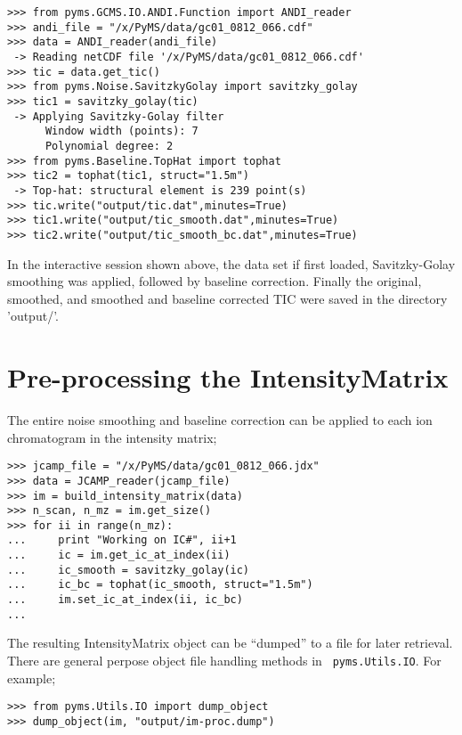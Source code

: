 \begin{verbatim}
>>> from pyms.GCMS.IO.ANDI.Function import ANDI_reader
>>> andi_file = "/x/PyMS/data/gc01_0812_066.cdf"
>>> data = ANDI_reader(andi_file)
 -> Reading netCDF file '/x/PyMS/data/gc01_0812_066.cdf'
>>> tic = data.get_tic()
>>> from pyms.Noise.SavitzkyGolay import savitzky_golay
>>> tic1 = savitzky_golay(tic)
 -> Applying Savitzky-Golay filter
      Window width (points): 7
      Polynomial degree: 2
>>> from pyms.Baseline.TopHat import tophat
>>> tic2 = tophat(tic1, struct="1.5m")
 -> Top-hat: structural element is 239 point(s)
>>> tic.write("output/tic.dat",minutes=True)
>>> tic1.write("output/tic_smooth.dat",minutes=True)
>>> tic2.write("output/tic_smooth_bc.dat",minutes=True)
\end{verbatim}

\noindent
In the interactive session shown above, the data set if first loaded,
Savitzky-Golay smoothing was applied, followed by baseline correction.
Finally the original, smoothed, and smoothed and baseline corrected
TIC were saved in the directory 'output/'.

\section{Pre-processing the IntensityMatrix}


The entire noise smoothing and baseline correction can be applied to each ion
chromatogram in the intensity matrix;

\begin{verbatim}
>>> jcamp_file = "/x/PyMS/data/gc01_0812_066.jdx"
>>> data = JCAMP_reader(jcamp_file)
>>> im = build_intensity_matrix(data)
>>> n_scan, n_mz = im.get_size()
>>> for ii in range(n_mz):
...     print "Working on IC#", ii+1
...     ic = im.get_ic_at_index(ii)
...     ic_smooth = savitzky_golay(ic)
...     ic_bc = tophat(ic_smooth, struct="1.5m")
...     im.set_ic_at_index(ii, ic_bc)
...
\end{verbatim}

The resulting IntensityMatrix object can be ``dumped'' to a file for later
retrieval. There are general perpose object file handling methods in {\tt
pyms.Utils.IO}. For example;

\begin{verbatim}
>>> from pyms.Utils.IO import dump_object
>>> dump_object(im, "output/im-proc.dump")
\end{verbatim}
